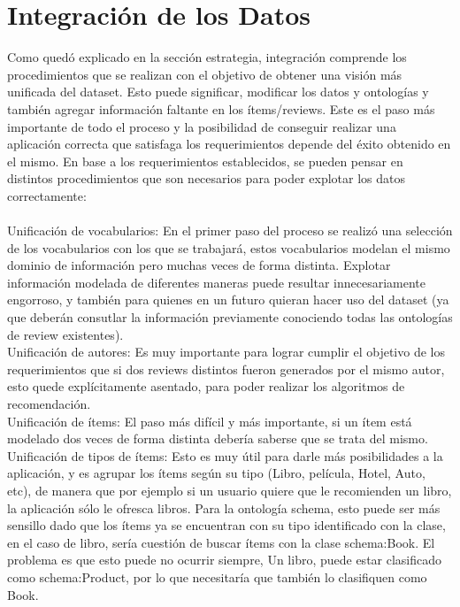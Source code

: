 \chapter{Integración de los Datos}
\label{chapter:integracion}

Como quedó explicado en la sección estrategia, integración comprende los procedimientos que se realizan con el objetivo de obtener una
visión más unificada del dataset.
Esto puede significar, modificar los datos y ontologías y también agregar información faltante en los ítems/reviews.
Este es el paso más importante de todo el proceso y la posibilidad de conseguir realizar una aplicación correcta que satisfaga los requerimientos
depende del éxito obtenido en el mismo.
En base a los requerimientos establecidos, se pueden pensar en distintos procedimientos que son necesarios para poder explotar los datos
correctamente:
\\
\\
Unificación de vocabularios: En el primer paso del proceso se realizó una selección de los vocabularios con los que se trabajará, 
estos vocabularios modelan el mismo dominio de información pero muchas veces de forma distinta. Explotar información modelada de 
diferentes maneras puede resultar innecesariamente engorroso, y también para quienes en un futuro quieran hacer uso del dataset (ya que
deberán consutlar la información previamente conociendo todas las ontologías de review existentes).\\
Unificación de autores: Es muy importante para lograr cumplir el objetivo de los requerimientos que si dos reviews distintos fueron 
generados por el mismo autor, esto quede explícitamente asentado, para poder realizar los algoritmos de recomendación.\\
Unificación de ítems: El paso más difícil y más importante, si un ítem está modelado dos veces de forma distinta debería saberse que 
se trata del mismo.\\
Unificación de tipos de ítems: Esto es muy útil para darle más posibilidades a la aplicación, y es agrupar los ítems según su tipo 
(Libro, película, Hotel, Auto, etc), de manera que por ejemplo si un usuario quiere que le recomienden un libro, la aplicación sólo 
le ofresca libros. Para la ontología schema, esto puede ser más sensillo dado que los ítems ya se encuentran con su tipo identificado con 
la clase, en el caso de libro, sería cuestión de buscar ítems con la clase schema:Book. El problema es que esto puede no ocurrir siempre, 
Un libro, puede estar clasificado como schema:Product, por lo que necesitaría que también lo clasifiquen como Book.\\
